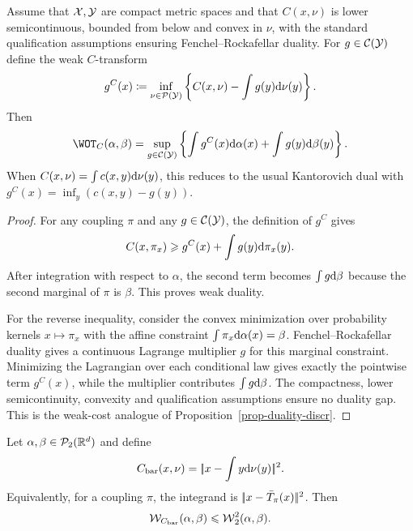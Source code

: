 \begin{prop}\label{prop-weak-ot-duality}
	Assume that $\mathcal{X},\mathcal{Y}$ are compact metric spaces and that $C(x,\nu)$ is lower semicontinuous, bounded from below and convex in $\nu$, with the standard qualification assumptions ensuring Fenchel--Rockafellar duality. For $g\in\mathcal{C}(\mathcal{Y})$ define the weak $C$-transform
	\[
		g^C(x)
		\coloneqq
		\inf_{\nu\in\mathcal{P}(\mathcal{Y})}
		\left\{
			C(x,\nu)-\int g(y)\mathrm{d}\nu(y)
		\right\}.
	\]
	Then
	\[
		\WOT_C(\alpha,\beta)
		=
		\sup_{g\in\Cc(\Y)}
		\left\{
			\int g^C(x)\d\alpha(x)+\int g(y)\d\beta(y)
		\right\}.
	\]
	When $C(x,\nu)=\int c(x,y)\mathrm{d}\nu(y)$, this reduces to the usual Kantorovich dual with $g^C(x)=\inf_y(c(x,y)-g(y))$.
\end{prop}

\begin{proof}
	For any coupling $\pi$ and any $g\in\mathcal{C}(\mathcal{Y})$, the definition of $g^C$ gives
	\[
		C(x,\pi_x)\geqslant g^C(x)+\int g(y)\mathrm{d}\pi_x(y).
	\]
	After integration with respect to $\alpha$, the second term becomes $\int g\mathrm{d}\beta$ because the second marginal of $\pi$ is $\beta$. This proves weak duality.

	For the reverse inequality, consider the convex minimization over probability kernels $x\mapsto\pi_x$ with the affine constraint $\int \pi_x\mathrm{d}\alpha(x)=\beta$. Fenchel--Rockafellar duality gives a continuous Lagrange multiplier $g$ for this marginal constraint. Minimizing the Lagrangian over each conditional law gives exactly the pointwise term $g^C(x)$, while the multiplier contributes $\int g\mathrm{d}\beta$. The compactness, lower semicontinuity, convexity and qualification assumptions ensure no duality gap. This is the weak-cost analogue of Proposition~\ref{prop-duality-discr}.
\end{proof}

\begin{prop}\label{prop-barycentric-weak-ot}
	Let $\alpha,\beta\in\mathcal{P}_2(\mathbb{R}^d)$ and define
	\[
		C_{\mathrm{bar}}(x,\nu)
		=
		|\!| x-\int y\mathrm{d}\nu(y) |\!|^2.
	\]
	Equivalently, for a coupling $\pi$, the integrand is $|\!| x-\bar T_\pi(x) |\!|^2$. Then
	\[
		\mathcal{W}_{C_{\mathrm{bar}}}(\alpha,\beta)
		\leqslant
		\operatorname{\mathcal{W}}_2^2(\alpha,\beta).
	\]
\end{prop}

